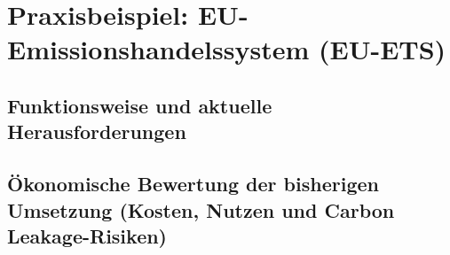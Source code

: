 \chapter{Praxisbeispiel: EU-Emissionshandelssystem (EU-ETS)}

\section{Funktionsweise und aktuelle Herausforderungen}

\section{Ökonomische Bewertung der bisherigen Umsetzung (Kosten, Nutzen und Carbon Leakage-Risiken)}







\nocite{*}